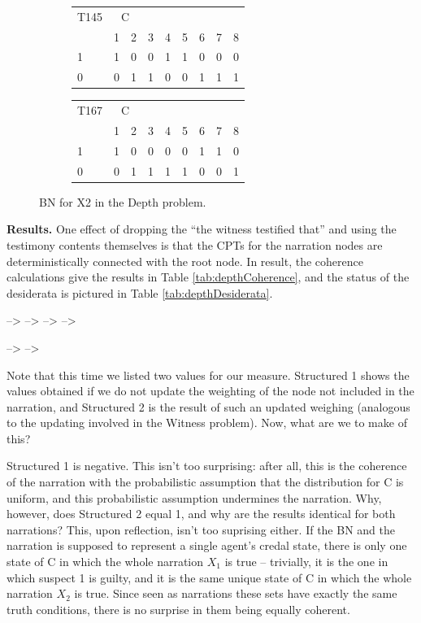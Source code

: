\documentclass[
  10pt,
]{scrartcl}
\begin{document}
\begin{figure}[H]
{\begin{subfigure}[!ht]{0.3\textwidth}
\begin{tabular}{lrrrrrrrr}
\toprule
\multicolumn{1}{c}{T145} & \multicolumn{2}{c}{C} \\
  & 1 & 2 & 3 & 4 & 5 & 6 & 7 & 8\\
\midrule
1 & 1 & 0 & 0 & 1 & 1 & 0 & 0 & 0\\
0 & 0 & 1 & 1 & 0 & 0 & 1 & 1 & 1\\
\bottomrule
\end{tabular}


\begin{tabular}{lrrrrrrrr}
\toprule
\multicolumn{1}{c}{T167} & \multicolumn{2}{c}{C} \\
  & 1 & 2 & 3 & 4 & 5 & 6 & 7 & 8\\
\midrule
1 & 1 & 0 & 0 & 0 & 0 & 1 & 1 & 0\\
0 & 0 & 1 & 1 & 1 & 1 & 0 & 0 & 1\\
\bottomrule
\end{tabular}
\end{subfigure}}
\caption{BN for \textsf{X2} in the \textsf{Depth} problem.}
\label{fig:dod2}
\end{figure}

\textbf{Results.} One effect of dropping the ``the witness testified that'' and using the testimony contents themselves is that the CPTs for the narration nodes are deterministically connected with the root node. In result, the coherence calculations give the results in Table \ref{tab:depthCoherence}, and the status of the desiderata is pictured in Table \ref{tab:depthDesiderata}.

--\textgreater{}
--\textgreater{}
--\textgreater{}
--\textgreater{}

--\textgreater{}
--\textgreater{}


Note that this time we listed two values for our measure. \textsf{Structured 1} shows the values obtained if we do not update the weighting of the node not included in the narration, and \textsf{Structured 2} is the result of such an updated weighing (analogous to the updating involved in the \textsf{Witness} problem). Now, what are we to make of this?

\textsf{Structured 1} is negative. This isn't too surprising: after all, this is the coherence of the narration with the probabilistic assumption that the distribution for \textsf{C} is uniform, and this probabilistic assumption undermines the narration. Why, however, does \textsf{Structured 2} equal 1, and why are the results identical for both narrations? This, upon reflection, isn't too suprising either. If the BN and the narration is supposed to represent a single agent's credal state, there is only one state of \textsf{C} in which the whole narration \(X_1\) is true -- trivially, it is the one in which suspect 1 is guilty, and it is the same unique state of \textsf{C} in which the whole narration \(X_2\) is true. Since seen as narrations these sets have exactly the same truth conditions, there is no surprise in them being equally coherent.
\end{document}
